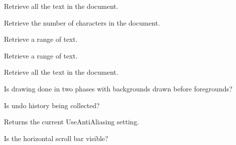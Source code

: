 Retrieve all the text in the document.


\label{wxstyledtextctrlgettextlength}


Retrieve the number of characters in the document.


\label{wxstyledtextctrlgettextrange}


Retrieve a range of text.


\label{wxstyledtextctrlgettextrangeraw}


Retrieve a range of text.


\label{wxstyledtextctrlgettextraw}


Retrieve all the text in the document.


\label{wxstyledtextctrlgettwophasedraw}


Is drawing done in two phases with backgrounds drawn before foregrounds?


\label{wxstyledtextctrlgetundocollection}


Is undo history being collected?


\label{wxstyledtextctrlgetuseantialiasing}


Returns the current UseAntiAliasing setting.


\label{wxstyledtextctrlgetusehorizontalscrollbar}


Is the horizontal scroll bar visible?


\label{wxstyledtextctrlgetusetabs}

